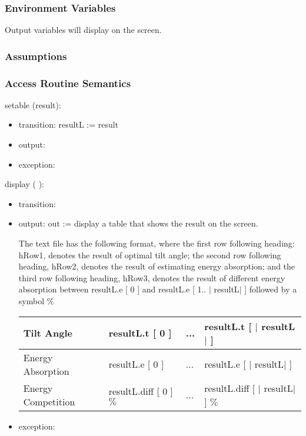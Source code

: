 \documentclass[12pt, titlepage]{article}
\begin{document}
\subsubsection{Environment Variables}
Output variables will display on the screen. 

\subsubsection{Assumptions}


\subsubsection{ Access Routine Semantics}

\noindent  setable (result):
\begin{itemize}
\item transition: resultL := result
\item output:
\item exception: 
\end{itemize}

\noindent  display ( ):
\begin{itemize}
\item transition:
\item output: out := display a table that shows the result on the screen.

The text file has the following format, where the first row following heading: hRow1, denotes the result of optimal tilt angle; the second row following heading, hRow2, denotes the result of estimating energy absorption; and the third row following heading, hRow3, denotes the result of different energy absorption between resultL.e [ 0 ] and resultL.e [ 1.. $|$ resultL$|$ ] followed by a symbol $\%$


\begin{center}
\begin{tabular}{p{4.5cm}|p{4cm}|p{1cm}|p{5cm}}

\hline 
Tilt Angle & resultL.t [ 0 ] & ...  & resultL.t [ $|$ resultL$|$ ] \\
\hline 
Energy Absorption & resultL.e [ 0 ] & ...  & resultL.e [ $|$ resultL$|$ ] \\
\hline 
Energy Competition & resultL.diff [ 0 ] $\%$    & ...     & resultL.diff [ $|$ resultL$|$ ] $\%$    \\
\hline
\end{tabular}
\end{center}

\item exception: 
\end{itemize}
\end{document}
